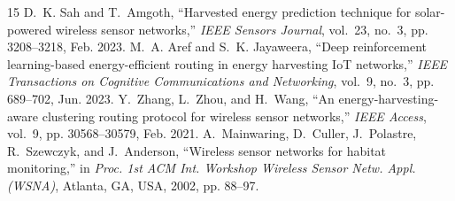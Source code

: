 \documentclass[journal]{IEEEtran}
\begin{document}
\begin{thebibliography}{15}
D.~K. Sah and T.~Amgoth, ``Harvested energy prediction technique for solar-powered wireless sensor networks,'' \textit{IEEE Sensors Journal}, vol.~23, no.~3, pp. 3208--3218, Feb. 2023.
M.~A. Aref and S.~K. Jayaweera, ``Deep reinforcement learning-based energy-efficient routing in energy harvesting IoT networks,'' \textit{IEEE Transactions on Cognitive Communications and Networking}, vol.~9, no.~3, pp. 689--702, Jun. 2023.
Y.~Zhang, L.~Zhou, and H.~Wang, ``An energy-harvesting-aware clustering routing protocol for wireless sensor networks,'' \textit{IEEE Access}, vol.~9, pp. 30568--30579, Feb. 2021.
A.~Mainwaring, D.~Culler, J.~Polastre, R.~Szewczyk, and J.~Anderson, ``Wireless sensor networks for habitat monitoring,'' in \textit{Proc. 1st ACM Int. Workshop Wireless Sensor Netw. Appl. (WSNA)}, Atlanta, GA, USA, 2002, pp. 88--97.
\end{thebibliography}
\end{document}
